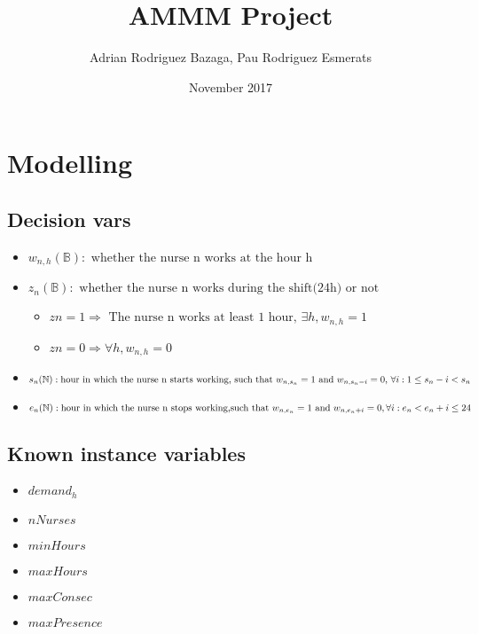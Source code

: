 \documentclass{article}
\title{AMMM Project}
\author{Adrian Rodriguez Bazaga, Pau Rodriguez Esmerats }
\date{November 2017}
\begin{document}
\maketitle





\section{ Modelling }


\subsection{ Decision vars }

\begin{itemize}

\item $ w_{n,h} (\mathbb{B})  : \text{ whether the nurse n works at the hour h }  $
\item $ z_{n} (\mathbb{B})  : \text{ whether the nurse n works during the shift(24h) or not } $ 
	\begin{itemize}[label=$\star$]
 	\item $ z{n} = 1  \Rightarrow \text{ The nurse n works at least 1 hour, } \exists h, w_{n,h} = 1 $ 
 	\item $ z{n} = 0 \Rightarrow \forall h, w_{n,h} = 0 $ 
 	\end{itemize}
\item $  s_{n} (\mathbb{N}) : \text{hour in which the nurse n starts working,} \\ \text{  such that $ w_{n,s_{n}}=1 $ and  $ w_{n,s_{n}-i}=0 $,  $ \forall i: 1 \leq s_{n} - i < s_{n} $ } $
\item $  e_{n} (\mathbb{N}) : \text{hour in which the nurse n stops working,} \\ \text{such that $ w_{n,e_{n}}=1 $ and  $ w_{n,e_{n}+i}=0,\forall i : e_{n} < e_{n}+i \leq 24 $  } $
\end{itemize}

\subsection{  Known instance variables }

\begin{itemize}
\item  $ demand_h $
\item  $ nNurses  $
\item  $minHours $
\item  $maxHours $
\item  $maxConsec $
\item  $maxPresence $
\end{itemize}
\end{document}

